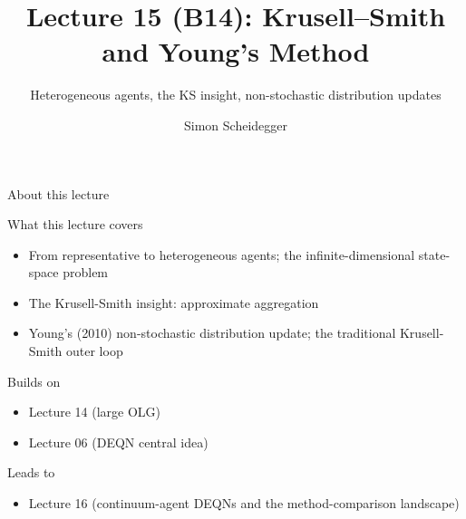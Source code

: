 \documentclass[aspectratio=169,11pt]{beamer}
\title[Lecture 15 (B14)]{Lecture 15 (B14): Krusell--Smith and Young's Method}
\subtitle{Heterogeneous agents, the KS insight, non-stochastic distribution updates}
\author{Simon Scheidegger}
\institute{HEC, University of Lausanne}
\date{}
\begin{document}
\providecommand{\exercisepause}{%
  \tikz[baseline=(X.base)]{\node[fill=darkgreen!80!black, text=white,
  rounded corners=2pt, inner sep=3pt, font=\scriptsize\bfseries](X){PAUSE};}}

{
\begin{frame}
\titlepage
\end{frame}
}

\begin{frame}{About this lecture}
\small
\begin{block}{What this lecture covers}
\begin{itemize}\itemsep2pt
  \item From representative to heterogeneous agents; the infinite-dimensional state-space problem
  \item The Krusell-Smith insight: approximate aggregation
  \item Young's (2010) non-stochastic distribution update; the traditional Krusell-Smith outer loop
\end{itemize}
\end{block}
\begin{block}{Builds on}
\begin{itemize}\itemsep2pt
  \item Lecture 14 (large OLG)
  \item Lecture 06 (DEQN central idea)
\end{itemize}
\end{block}
\begin{block}{Leads to}
\begin{itemize}\itemsep2pt
  \item Lecture 16 (continuum-agent DEQNs and the method-comparison landscape)
\end{itemize}
\end{block}
\end{frame}
\end{document}
